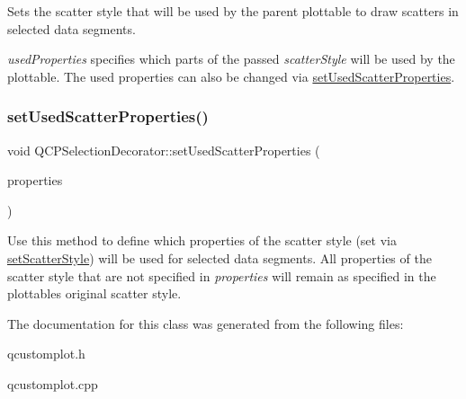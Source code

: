 Sets the scatter style that will be used by the parent plottable to draw scatters in selected data segments.

{\itshape used\+Properties} specifies which parts of the passed {\itshape scatter\+Style} will be used by the plottable. The used properties can also be changed via \hyperlink{class_q_c_p_selection_decorator_a808c1607cd4e83869c04986e332455c0}{set\+Used\+Scatter\+Properties}. \mbox{\label{class_q_c_p_selection_decorator_a808c1607cd4e83869c04986e332455c0}} 
\subsubsection{\texorpdfstring{set\+Used\+Scatter\+Properties()}{setUsedScatterProperties()}}
{\footnotesize\ttfamily void Q\+C\+P\+Selection\+Decorator\+::set\+Used\+Scatter\+Properties (\begin{DoxyParamCaption}\item[{const Q\+C\+P\+Scatter\+Style\+::\+Scatter\+Properties \&}]{properties }\end{DoxyParamCaption})}

Use this method to define which properties of the scatter style (set via \hyperlink{class_q_c_p_selection_decorator_ab403a613289714ff4fd4a0c0371ab116}{set\+Scatter\+Style}) will be used for selected data segments. All properties of the scatter style that are not specified in {\itshape properties} will remain as specified in the plottable\textquotesingle{}s original scatter style. 

The documentation for this class was generated from the following files\+:\begin{DoxyCompactItemize}
\item 
qcustomplot.\+h\item 
qcustomplot.\+cpp\end{DoxyCompactItemize}
